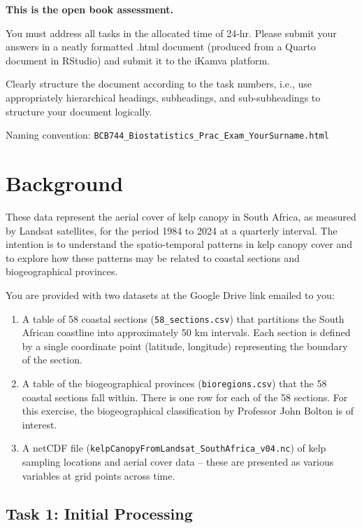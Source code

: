 \documentclass[
  british,
  10pt,
]{article}
\providecommand{\tightlist}{%
  \setlength{\itemsep}{0pt}\setlength{\parskip}{0pt}}
\let\oldtexttt\texttt
\renewcommand{\texttt}[1]{\oldtexttt{\small #1}}
\begin{document}
{\textbf{This is the open book assessment.}}

You must address all tasks in the allocated time of 24-hr. Please submit
your answers in a neatly formatted .html document (produced from a
Quarto document in RStudio) and submit it to the iKamva platform.

Clearly structure the document according to the task numbers, i.e., use
appropriately hierarchical headings, subheadings, and sub-subheadings to
structure your document logically.

Naming convention:
\texttt{BCB744\_Biostatistics\_Prac\_Exam\_YourSurname.html}

\section{Background}\label{background}

These data represent the aerial cover of kelp canopy in South Africa, as
measured by Landsat satellites, for the period 1984 to 2024 at a
quarterly interval. The intention is to understand the spatio-temporal
patterns in kelp canopy cover and to explore how these patterns may be
related to coastal sections and biogeographical provinces.

You are provided with two datasets at the Google Drive link emailed to
you:

\begin{enumerate}
\def\labelenumi{\arabic{enumi}.}
\tightlist
\item
  A table of 58 coastal sections (\texttt{58\_sections.csv}) that
  partitions the South African coastline into approximately 50 km
  intervals. Each section is defined by a single coordinate point
  (latitude, longitude) representing the boundary of the section.
\item
  A table of the biogeographical provinces (\texttt{bioregions.csv})
  that the 58 coastal sections fall within. There is one row for each of
  the 58 sections. For this exercise, the biogeographical classification
  by Professor John Bolton is of interest.
\item
  A netCDF file (\texttt{kelpCanopyFromLandsat\_SouthAfrica\_v04.nc}) of
  kelp sampling locations and aerial cover data -- these are presented
  as various variables at grid points across time.
\end{enumerate}

\subsection{Task 1: Initial Processing}\label{task-1-initial-processing}
\end{document}
